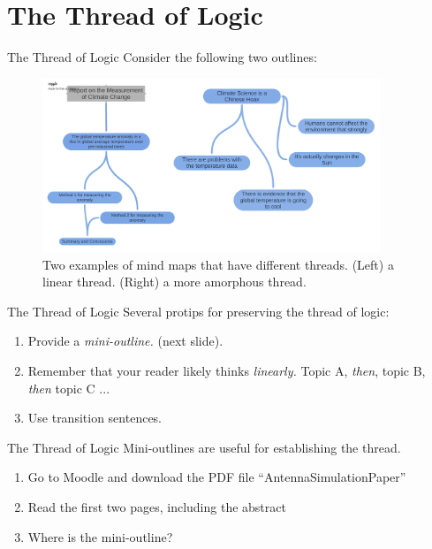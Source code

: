 \documentclass{beamer}
\begin{document}
\section{The Thread of Logic}

\begin{frame}{The Thread of Logic}
Consider the following two outlines:
\begin{figure}
\centering
\includegraphics[width=0.9\textwidth]{figures/climate.pdf}
\caption{\label{fig:climate} Two examples of mind maps that have different threads. (Left) a linear thread.  (Right) a more amorphous thread.}
\end{figure}
\end{frame}

\begin{frame}{The Thread of Logic}
Several protips for preserving the thread of logic:
\begin{enumerate}
\item Provide a \textit{mini-outline.} (next slide).
\item Remember that your reader likely thinks \textit{linearly.}  Topic A, \textit{then}, topic B, \textit{then} topic C ...
\item Use transition sentences.
\end{enumerate}
\end{frame}

\begin{frame}{The Thread of Logic}
\alert{Mini-outlines are useful for establishing the thread.}
\begin{enumerate}
\item Go to Moodle and download the PDF file ``AntennaSimulationPaper''
\item Read the first two pages, including the abstract
\item Where is the mini-outline?
\end{enumerate}
\end{frame}
\end{document}
